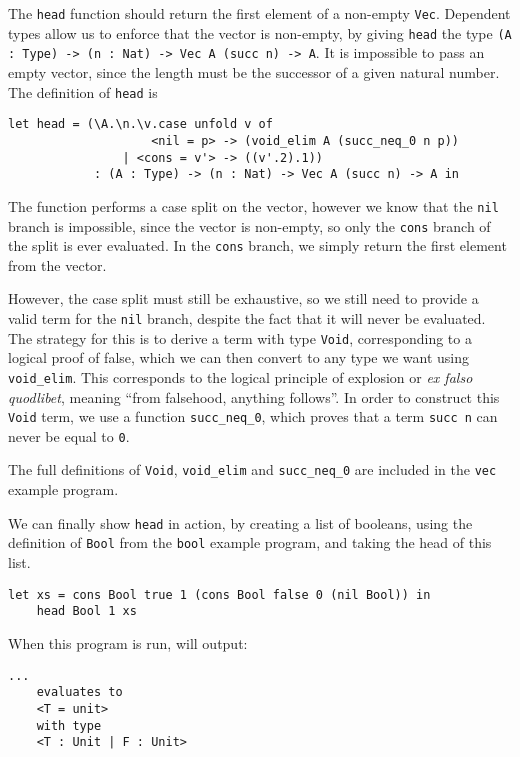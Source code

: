\documentclass[12pt,a4paper,twoside]{report}
\begin{document}
The \lstinline{head} function should return the first element of a non-empty \lstinline{Vec}.
Dependent types allow us to enforce that the vector is non-empty, by giving \lstinline{head} the type \lstinline{(A : Type) -> (n : Nat) -> Vec A (succ n) -> A}.
It is impossible to pass an empty vector, since the length must be the successor of a given natural number.
The definition of \lstinline{head} is
\begin{lstlisting}[gobble=4]
    let head = (\A.\n.\v.case unfold v of
                    <nil = p> -> (void_elim A (succ_neq_0 n p))
                | <cons = v'> -> ((v'.2).1))
            : (A : Type) -> (n : Nat) -> Vec A (succ n) -> A in
\end{lstlisting}
The function performs a case split on the vector, however we know that the \lstinline{nil} branch is impossible, since the vector is non-empty, so only the \lstinline{cons} branch of the split is ever evaluated.
In the \lstinline{cons} branch, we simply return the first element from the vector.

However, the case split must still be exhaustive, so we still need to provide a valid term for the \lstinline{nil} branch, despite the fact that it will never be evaluated.
The strategy for this is to derive a term with type \lstinline{Void}, corresponding to a logical proof of false, which we can then convert to any type we want using \lstinline{void_elim}.
This corresponds to the logical principle of explosion or \textit{ex falso quodlibet}, meaning ``from falsehood, anything follows''.
In order to construct this \lstinline{Void} term, we use a function \lstinline{succ_neq_0}, which proves that a term \lstinline{succ n} can never be equal to \lstinline{0}.

The full definitions of \lstinline{Void}, \lstinline{void_elim} and \lstinline{succ_neq_0} are included in the \texttt{vec} example program.

We can finally show \lstinline{head} in action, by creating a list of booleans, using the definition of \lstinline{Bool} from the \texttt{bool} example program, and taking the head of this list.
\begin{lstlisting}[gobble=4]
    let xs = cons Bool true 1 (cons Bool false 0 (nil Bool)) in
    head Bool 1 xs
\end{lstlisting}
When this program is run, \pimu{} will output:
\begin{lstlisting}[gobble=4]
    ...
    evaluates to
    <T = unit>
    with type
    <T : Unit | F : Unit>
\end{lstlisting}
\end{document}
